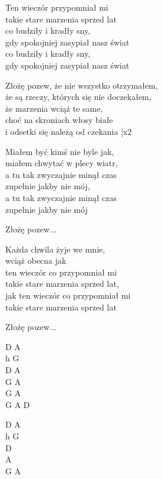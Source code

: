 \begin{text}
    
    Ten wieczór przypomniał mi\\
    takie stare marzenia sprzed lat\\
    co budziły i kradły sny,\\
    gdy spokojniej zasypiał nasz świat\\
    co budziły i kradły sny,\\
    gdy spokojniej zasypiał nasz świat

    \vin Złożę pozew, że nie wszystko otrzymałem,\\
    \vin że są rzeczy, których się nie doczekałem,\\
    \vin że marzenia wciąż te same,\\
    \vin choć na skroniach włosy białe\\ 
    \vin i odsetki się należą od czekania |x2

    Miałem być kimś nie byle jak,\\
    miałem chwytać w plecy wiatr,\\
    a tu tak zwyczajnie minął czas\\
    zupełnie jakby nie mój,\\
    a tu tak zwyczajnie minął czas\\
    zupełnie jakby nie mój

    \vin Złożę pozew...

    Każda chwila żyje we mnie,\\
    wciąż obecna jak\\
    ten wieczór co przypomniał mi \\
    takie stare marzenia sprzed lat,\\
    jak ten wieczór co przypomniał mi \\
    takie stare marzenia sprzed lat

	\vin Złożę pozew...
\end{text}
\begin{chord}
    D A \\
    h G \\
    D A \\
    G A \\
    G A \\
    G A D 

    D A\\
    h G\\ 
    D\\
    A\\
    G A
\end{chord}
